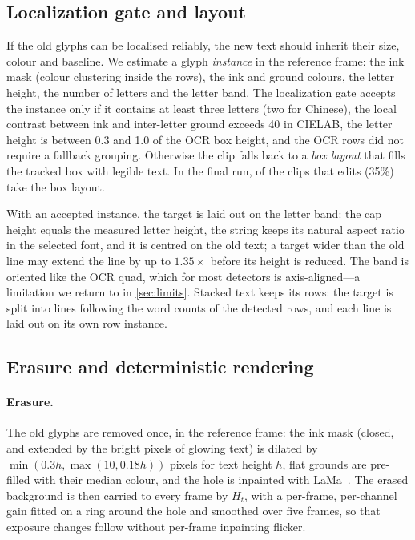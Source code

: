 \subsection{Localization gate and layout}
\label{sec:loc}
If the old glyphs can be localised reliably, the new text should inherit their size, colour and baseline. We estimate a glyph \emph{instance} in the reference frame: the ink mask (colour clustering inside the rows), the ink and ground colours, the letter height, the number of letters and the letter band. The localization gate accepts the instance only if it contains at least three letters (two for Chinese), the local contrast between ink and inter-letter ground exceeds 40 in CIELAB, the letter height is between 0.3 and 1.0 of the OCR box height, and the OCR rows did not require a fallback grouping. Otherwise the clip falls back to a \emph{box layout} that fills the tracked box with legible text. In the final run, \rBoxPolicy{} of the \rOursCollatN{} clips that \method edits (35\%) take the box layout.

With an accepted instance, the target is laid out on the letter band: the cap height equals the measured letter height, the string keeps its natural aspect ratio in the selected font, and it is centred on the old text; a target wider than the old line may extend the line by up to $1.35\times$ before its height is reduced. The band is oriented like the OCR quad, which for most detectors is axis-aligned---a limitation we return to in \cref{sec:limits}. Stacked text keeps its rows: the target is split into lines following the word counts of the detected rows, and each line is laid out on its own row instance.

\subsection{Erasure and deterministic rendering}
\label{sec:render}
\paragraph{Erasure.} The old glyphs are removed once, in the reference frame: the ink mask (closed, and extended by the bright pixels of glowing text) is dilated by $\min(0.3h,\max(10,0.18h))$ pixels for text height $h$, flat grounds are pre-filled with their median colour, and the hole is inpainted with LaMa~\cite{suvorov2022lama}. The erased background is then carried to every frame by $H_t$, with a per-frame, per-channel gain fitted on a ring around the hole and smoothed over five frames, so that exposure changes follow without per-frame inpainting flicker.

